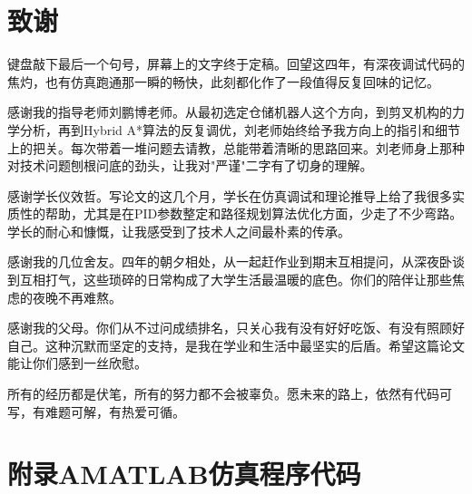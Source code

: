



\chapter*{\sanhao\heiti\textbf{致\qquad 谢}}

键盘敲下最后一个句号，屏幕上的文字终于定稿。回望这四年，有深夜调试代码的焦灼，也有仿真跑通那一瞬的畅快，此刻都化作了一段值得反复回味的记忆。

感谢我的指导老师刘鹏博老师。从最初选定仓储机器人这个方向，到剪叉机构的力学分析，再到Hybrid A*算法的反复调优，刘老师始终给予我方向上的指引和细节上的把关。每次带着一堆问题去请教，总能带着清晰的思路回来。刘老师身上那种对技术问题刨根问底的劲头，让我对"严谨"二字有了切身的理解。

感谢学长仪效哲。写论文的这几个月，学长在仿真调试和理论推导上给了我很多实质性的帮助，尤其是在PID参数整定和路径规划算法优化方面，少走了不少弯路。学长的耐心和慷慨，让我感受到了技术人之间最朴素的传承。

感谢我的几位舍友。四年的朝夕相处，从一起赶作业到期末互相提问，从深夜卧谈到互相打气，这些琐碎的日常构成了大学生活最温暖的底色。你们的陪伴让那些焦虑的夜晚不再难熬。

感谢我的父母。你们从不过问成绩排名，只关心我有没有好好吃饭、有没有照顾好自己。这种沉默而坚定的支持，是我在学业和生活中最坚实的后盾。希望这篇论文能让你们感到一丝欣慰。

所有的经历都是伏笔，所有的努力都不会被辜负。愿未来的路上，依然有代码可写，有难题可解，有热爱可循。



\chapter*{\sanhao\heiti\textbf{附录A\quad MATLAB仿真程序代码}}

